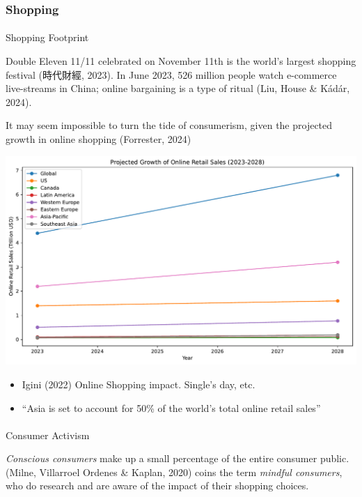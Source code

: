 \documentclass[
  letterpaper,
  DIV=11,
  numbers=noendperiod]{scrartcl}
\makeatletter
\let\oldparagraph\paragraph
\renewcommand{\paragraph}{
    \@ifstar
      \xxxParagraphStar
      \xxxParagraphNoStar
  }
\newcommand{\xxxParagraphStar}[1]{\oldparagraph*{#1}\mbox{}}
\newcommand{\xxxParagraphNoStar}[1]{\oldparagraph{#1}\mbox{}}
\makeatother
\begin{document}
\subsubsection{Shopping}\label{shopping}

\paragraph{Shopping Footprint}\label{shopping-footprint}

Double Eleven 11/11 celebrated on November 11th is the world's largest
shopping festival (時代財經, 2023). In June 2023, 526 million people
watch e-commerce live-streams in China; online bargaining is a type of
ritual (Liu, House \& Kádár, 2024).

It may seem impossible to turn the tide of consumerism, given the
projected growth in online shopping (Forrester, 2024)

\includegraphics{_thesis_files/figure-pdf/cell-36-output-1.pdf}

\begin{itemize}
\item
  Igini (2022) Online Shopping impact. Single's day, etc.
\item
  ``Asia is set to account for 50\% of the world's total online retail
  sales''
\end{itemize}

\paragraph{Consumer Activism}\label{consumer-activism}

\emph{Conscious consumers} make up a small percentage of the entire
consumer public. (Milne, Villarroel Ordenes \& Kaplan, 2020) coins the
term \emph{mindful consumers}, who do research and are aware of the
impact of their shopping choices.
\end{document}
